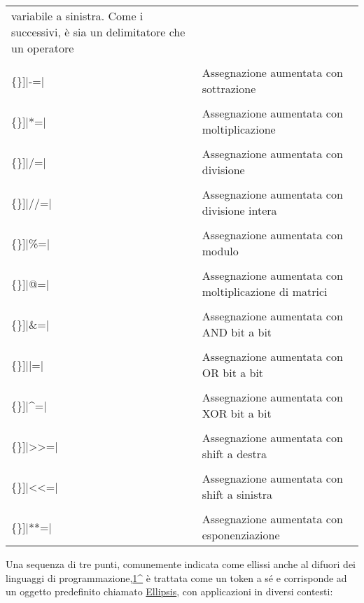 \documentclass[
  letterpaper,
]{scrbook}
\newcommand{\VerbBar}{|}
\newcommand{\VERB}{\Verb[commandchars=\\\{\}]}
\newcommand{\OperatorTok}[1]{\textcolor[rgb]{0.37,0.37,0.37}{#1}}
\begin{document}
\begin{longtable}[]{@{}
  >{\raggedright\arraybackslash}p{}
  >{\raggedright\arraybackslash}p{}@{}}
variabile a sinistra. Come i successivi, è sia un delimitatore che un
operatore \\
\VERB|\OperatorTok{{-}=}| & Assegnazione aumentata con sottrazione \\
\VERB|\OperatorTok{*=}| & Assegnazione aumentata con moltiplicazione \\
\VERB|\OperatorTok{/=}| & Assegnazione aumentata con divisione \\
\VERB|\OperatorTok{//=}| & Assegnazione aumentata con divisione
intera \\
\VERB|\OperatorTok{\%=}| & Assegnazione aumentata con modulo \\
\VERB|\OperatorTok{@=}| & Assegnazione aumentata con moltiplicazione di
matrici \\
\VERB|\OperatorTok{\&=}| & Assegnazione aumentata con AND bit a bit \\
\VERB|\OperatorTok{\VerbBar{}=}| & Assegnazione aumentata con OR bit a
bit \\
\VERB|\OperatorTok{\^{}=}| & Assegnazione aumentata con XOR bit a bit \\
\VERB|\OperatorTok{\textgreater{}\textgreater{}=}| & Assegnazione
aumentata con shift a destra \\
\VERB|\OperatorTok{\textless{}\textless{}=}| & Assegnazione aumentata
con shift a sinistra \\
\VERB|\OperatorTok{**=}| & Assegnazione aumentata con esponenziazione \\
\end{longtable}

Una sequenza di tre punti, comunemente indicata come ellissi anche al
difuori dei linguaggi di
programmazione,\href{L'ellissi\%20è\%20usata,\%20ad\%20esempio,\%20in\%20C\%20per\%20dichiarare\%20funzioni\%20che\%20accettano\%20un\%20numero\%20variaible\%20di\%20parametri\%20e\%20i\%20Javascript\%20come\%20operatore\%20per\%20espandere\%20gli\%20array\%20o\%20le\%20proprietà\%20di\%20un\%20oggetto.}{1\^{}}
è trattata come un token a sé e corrisponde ad un oggetto predefinito
chiamato
\href{https://docs.python.org/3/reference/datamodel.html\#ellipsis}{Ellipsis},
con applicazioni in diversi contesti:
\end{document}
